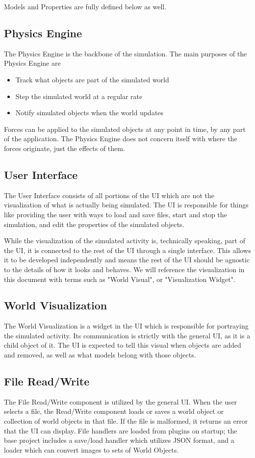 Models and Properties are fully defined below as well.

\subsection{Physics Engine}
The Physics Engine is the backbone of the simulation. The main purposes of the Physics Engine are
	\begin{itemize}
		\item Track what objects are part of the simulated world
		\item Step the simulated world at a regular rate
		\item Notify simulated objects when the world updates
	\end{itemize}
Forces can be applied to the simulated objects at any point in time, by any part of the application. The Physics Engine does not concern itself with where the forces originate, just the effects of them.
 
\subsection{User Interface}
The User Interface consists of all portions of the UI which are not the visualization of what is actually being simulated. The UI is responsible for things like providing the user with ways to load and save files, start and stop the simulation, and edit the properties of the simulated objects.

While the visualization of the simulated activity is, technically speaking, part of the UI, it is connected to the rest of the UI through a single interface. This allows it to be developed independently and means the rest of the UI should be agnostic to the details of how it looks and behaves. We will reference the visualization in this document with terms such as "World Visual", or "Visualization Widget".

\subsection{World Visualization}
The World Visualization is a widget in the UI which is responsible for portraying the simulated activity. Its communication is strictly with the general UI, as it is a child object of it. The UI is expected to tell this visual when objects are added and removed, as well as what models belong with those objects.

\subsection{File Read/Write}
The File Read/Write component is utilized by the general UI. When the user selects a file, the Read/Write component loads or saves a world object or collection of world objects in that file. If the file is malformed, it returns an error that the UI can display. File handlers are loaded from plugins on startup; the base project includes a save/load handler which utilizes JSON format, and a loader which can convert images to sets of World Objects.


